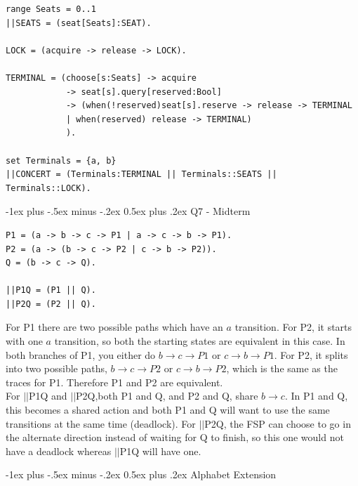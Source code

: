 \documentclass[letterpaper, 8pt]{extarticle}
\makeatletter
\renewcommand{\section}{\@startsection{section}{1}{0mm}%
                                {-1ex plus -.5ex minus -.2ex}%
                                {0.5ex plus .2ex}%
                                {\normalfont\normalsize\bfseries}}
\makeatother
\begin{document}
\begin{multicols*}{5}
\begin{lstlisting}
range Seats = 0..1
||SEATS = (seat[Seats]:SEAT).

LOCK = (acquire -> release -> LOCK).

TERMINAL = (choose[s:Seats] -> acquire
            -> seat[s].query[reserved:Bool]
            -> (when(!reserved)seat[s].reserve -> release -> TERMINAL
            | when(reserved) release -> TERMINAL)
            ).

set Terminals = {a, b}
||CONCERT = (Terminals:TERMINAL || Terminals::SEATS || Terminals::LOCK).
\end{lstlisting}

  \section{Q7 - Midterm}
  \begin{lstlisting}
P1 = (a -> b -> c -> P1 | a -> c -> b -> P1).
P2 = (a -> (b -> c -> P2 | c -> b -> P2)).
Q = (b -> c -> Q).

||P1Q = (P1 || Q).
||P2Q = (P2 || Q).
\end{lstlisting}
  For P1 there are two possible paths which have an $a$ transition. For P2, it starts with one $a$ transition, so both the starting states are equivalent in this case. In both branches of P1, you either do $b \rightarrow c \rightarrow P1$  or $c \rightarrow b \rightarrow P1$. For P2, it splits into two possible paths, $b \rightarrow c \rightarrow P2$ or $c \rightarrow b \rightarrow P2$, which is the same as the traces for P1. Therefore P1 and P2 are equivalent. \\
  For $||$P1Q and $||$P2Q,both P1 and Q, and P2 and Q, share $b \rightarrow c$. In P1 and Q, this becomes a shared action and both P1 and Q will want to use the same transitions at the same time (deadlock). For $||$P2Q, the FSP can choose to go in the alternate direction instead of waiting for Q to finish, so this one would not have a deadlock whereas $||$P1Q will have one.

  \section{Alphabet Extension}

\end{multicols*}
\end{document}
